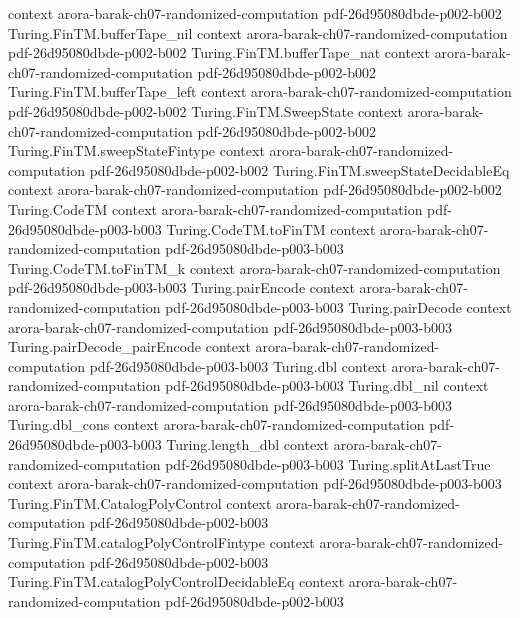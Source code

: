 \begin{theorem}
  {context}
  {arora-barak-ch07-randomized-computation}
  {pdf-26d95080dbde-p002-b002}
\proofstep
  {Turing.FinTM.bufferTape_nil}
  {context}
  {arora-barak-ch07-randomized-computation}
  {pdf-26d95080dbde-p002-b002}
\proofstep
  {Turing.FinTM.bufferTape_nat}
  {context}
  {arora-barak-ch07-randomized-computation}
  {pdf-26d95080dbde-p002-b002}
\proofstep
  {Turing.FinTM.bufferTape_left}
  {context}
  {arora-barak-ch07-randomized-computation}
  {pdf-26d95080dbde-p002-b002}
\proofstep
  {Turing.FinTM.SweepState}
  {context}
  {arora-barak-ch07-randomized-computation}
  {pdf-26d95080dbde-p002-b002}
\proofstep
  {Turing.FinTM.sweepStateFintype}
  {context}
  {arora-barak-ch07-randomized-computation}
  {pdf-26d95080dbde-p002-b002}
\proofstep
  {Turing.FinTM.sweepStateDecidableEq}
  {context}
  {arora-barak-ch07-randomized-computation}
  {pdf-26d95080dbde-p002-b002}
\proofstep
  {Turing.CodeTM}
  {context}
  {arora-barak-ch07-randomized-computation}
  {pdf-26d95080dbde-p003-b003}
\proofstep
  {Turing.CodeTM.toFinTM}
  {context}
  {arora-barak-ch07-randomized-computation}
  {pdf-26d95080dbde-p003-b003}
\proofstep
  {Turing.CodeTM.toFinTM_k}
  {context}
  {arora-barak-ch07-randomized-computation}
  {pdf-26d95080dbde-p003-b003}
\proofstep
  {Turing.pairEncode}
  {context}
  {arora-barak-ch07-randomized-computation}
  {pdf-26d95080dbde-p003-b003}
\proofstep
  {Turing.pairDecode}
  {context}
  {arora-barak-ch07-randomized-computation}
  {pdf-26d95080dbde-p003-b003}
\proofstep
  {Turing.pairDecode_pairEncode}
  {context}
  {arora-barak-ch07-randomized-computation}
  {pdf-26d95080dbde-p003-b003}
\proofstep
  {Turing.dbl}
  {context}
  {arora-barak-ch07-randomized-computation}
  {pdf-26d95080dbde-p003-b003}
\proofstep
  {Turing.dbl_nil}
  {context}
  {arora-barak-ch07-randomized-computation}
  {pdf-26d95080dbde-p003-b003}
\proofstep
  {Turing.dbl_cons}
  {context}
  {arora-barak-ch07-randomized-computation}
  {pdf-26d95080dbde-p003-b003}
\proofstep
  {Turing.length_dbl}
  {context}
  {arora-barak-ch07-randomized-computation}
  {pdf-26d95080dbde-p003-b003}
\proofstep
  {Turing.splitAtLastTrue}
  {context}
  {arora-barak-ch07-randomized-computation}
  {pdf-26d95080dbde-p003-b003}
\proofstep
  {Turing.FinTM.CatalogPolyControl}
  {context}
  {arora-barak-ch07-randomized-computation}
  {pdf-26d95080dbde-p002-b003}
\proofstep
  {Turing.FinTM.catalogPolyControlFintype}
  {context}
  {arora-barak-ch07-randomized-computation}
  {pdf-26d95080dbde-p002-b003}
\proofstep
  {Turing.FinTM.catalogPolyControlDecidableEq}
  {context}
  {arora-barak-ch07-randomized-computation}
  {pdf-26d95080dbde-p002-b003}

\end{theorem}
